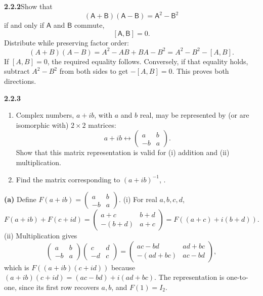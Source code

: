 \par\bigskip
\noindent\textbf{2.2.2}\quad Show that
\[
(\mathsf{A}+\mathsf{B})(\mathsf{A}-\mathsf{B})=\mathsf{A}^{2}-\mathsf{B}^{2}
\]
if and only if $\mathsf{A}$ and $\mathsf{B}$ commute,
\[
[\mathsf{A},\mathsf{B}]=0.
\]
\solution
Distribute while preserving factor order:
\[
(A+B)(A-B)=A^2-AB+BA-B^2=A^2-B^2-[A,B].
\]
If $[A,B]=0$, the required equality follows. Conversely, if that
equality holds, subtract $A^2-B^2$ from both sides to get
$-[A,B]=0$. This proves both directions.

\par\bigskip
\noindent\textbf{2.2.3}\quad
\begin{enumerate}
\item[(a)] Complex numbers, $a+ib$, with $a$ and $b$ real, may be represented
  by (or are isomorphic with) $2\times2$ matrices:
  \[
  a+ib\longleftrightarrow\begin{pmatrix}a&b\\-b&a\end{pmatrix}.
  \]
  Show that this matrix representation is valid for (i) addition and (ii)
  multiplication.
\item[(b)] Find the matrix corresponding to $(a+ib)^{-1}$,
  .
\end{enumerate}
\solution
\textbf{(a)} Define $F(a+ib)=\begin{pmatrix}a&b\\-b&a\end{pmatrix}$.
(i) For real $a,b,c,d$,
\[
F(a+ib)+F(c+id)=
\begin{pmatrix}a+c&b+d\\-(b+d)&a+c\end{pmatrix}
=F((a+c)+i(b+d)).
\]
(ii) Multiplication gives
\[
\begin{pmatrix}a&b\\-b&a\end{pmatrix}
\begin{pmatrix}c&d\\-d&c\end{pmatrix}
=\begin{pmatrix}ac-bd&ad+bc\\-(ad+bc)&ac-bd\end{pmatrix},
\]
which is $F((a+ib)(c+id))$ because
$(a+ib)(c+id)=(ac-bd)+i(ad+bc)$.
The representation is one-to-one, since its first row recovers $a,b$,
and $F(1)=I_2$.

